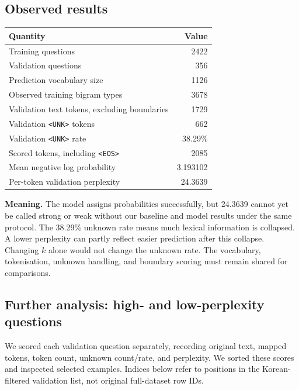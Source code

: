 \documentclass[11pt,a4paper]{article}
\newcommand{\unk}{\texttt{<UNK>}}
\newcommand{\eos}{\texttt{<EOS>}}
\begin{document}
\subsection{Observed results}
\begin{center}
\begin{tabular}{lr}
\toprule
Quantity & Value \\
\midrule
Training questions & 2422 \\
Validation questions & 356 \\
Prediction vocabulary size & 1126 \\
Observed training bigram types & 3678 \\
Validation text tokens, excluding boundaries & 1729 \\
Validation \unk{} tokens & 662 \\
Validation \unk{} rate & 38.29\% \\
Scored tokens, including \eos{} & 2085 \\
Mean negative log probability & 3.193102 \\
Per-token validation perplexity & 24.3639 \\
\bottomrule
\end{tabular}
\end{center}

\textbf{Meaning.} The model assigns probabilities successfully, but 24.3639 cannot yet be called strong or weak without our baseline and model results under the same protocol. The 38.29\% unknown rate means much lexical information is collapsed. A lower perplexity can partly reflect easier prediction after this collapse. Changing $k$ alone would not change the unknown rate. The vocabulary, tokenisation, unknown handling, and boundary scoring must remain shared for comparisons.

\subsection{Further analysis: high- and low-perplexity questions}
We scored each validation question separately, recording original text, mapped tokens, token count, unknown count/rate, and perplexity. We sorted these scores and inspected selected examples. Indices below refer to positions in the Korean-filtered validation list, not original full-dataset row IDs.
\end{document}
